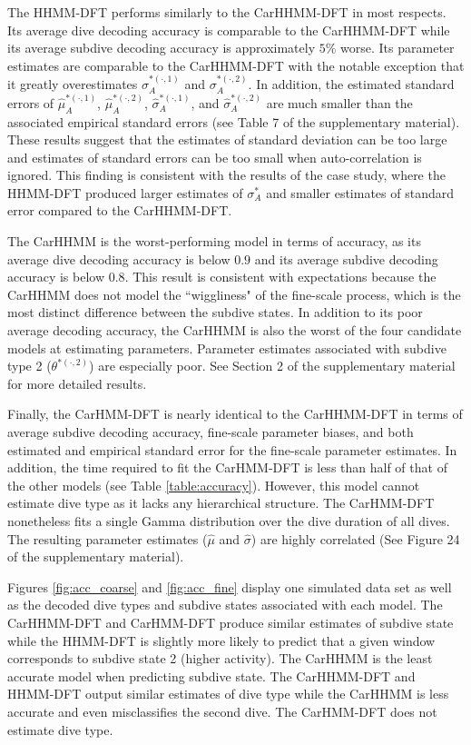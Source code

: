 The HHMM-DFT performs similarly to the CarHHMM-DFT in most respects. Its average dive decoding accuracy is comparable to the CarHHMM-DFT while its average subdive decoding accuracy is approximately $5 \%$ worse. Its parameter estimates are comparable to the CarHHMM-DFT with the notable exception that it greatly overestimates $\sigma_A^{*(\cdot,1)}$ and $\sigma_A^{*(\cdot,2)}$. In addition, the estimated standard errors of $\hat \mu_A^{*(\cdot,1)}$, $\hat \mu_A^{*(\cdot,2)}$, $\hat \sigma_A^{*(\cdot,1)}$, and $\hat \sigma_A^{*(\cdot,2)}$ are much smaller than the associated empirical standard errors (see Table 7 of the supplementary material). These results suggest that the estimates of standard deviation can be too large and estimates of standard errors can be too small when auto-correlation is ignored. This finding is consistent with the results of the case study, where the HHMM-DFT produced larger estimates of $\sigma_A^*$ and smaller estimates of standard error compared to the CarHHMM-DFT.

The CarHHMM is the worst-performing model in terms of accuracy, as its average dive decoding accuracy is below $0.9$ and its average subdive decoding accuracy is below $0.8$. This result is consistent with expectations because the CarHHMM does not model the ``wiggliness" of the fine-scale process, which is the most distinct difference between the subdive states. In addition to its poor average decoding accuracy, the CarHHMM is also the worst of the four candidate models at estimating parameters. Parameter estimates associated with subdive type 2 ($\theta^{*(\cdot,2)}$) are especially poor. See Section 2 of the supplementary material for more detailed results.

Finally, the CarHMM-DFT is nearly identical to the CarHHMM-DFT in terms of average subdive decoding accuracy, fine-scale parameter biases, and both estimated and empirical standard error for the fine-scale parameter estimates. In addition, the time required to fit the CarHMM-DFT is less than half of that of the other models (see Table \ref{table:accuracy}). However, this model cannot estimate dive type as it lacks any hierarchical structure. The CarHMM-DFT nonetheless fits a single Gamma distribution over the dive duration of all dives. The resulting parameter estimates ($\hat \mu$ and $\hat \sigma$) are highly correlated (See Figure 24 of the supplementary material).

Figures \ref{fig:acc_coarse} and \ref{fig:acc_fine} display one simulated data set as well as the decoded dive types and subdive states associated with each model. The CarHHMM-DFT and CarHMM-DFT produce similar estimates of subdive state while the HHMM-DFT is slightly more likely to predict that a given window corresponds to subdive state 2 (higher activity). The CarHHMM is the least accurate model when predicting subdive state. The CarHHMM-DFT and HHMM-DFT output similar estimates of dive type while the CarHHMM is less accurate and even misclassifies the second dive. The CarHMM-DFT does not estimate dive type.